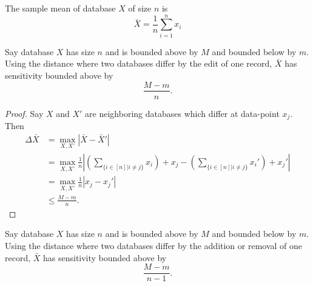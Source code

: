 \documentclass[11pt, oneside]{article}    %
\begin{document}
    \begin{definition}
        The sample mean of database $X$ of size $n$ is
        $$\bar{X} = \frac{1}{n} \sum_{i=1}^n x_i $$
    \end{definition}

    \begin{theorem}
        Say database $X$ has size $n$ and is bounded above by $M$ and bounded below by $m$. Using the distance where two databases differ by the edit of one record, $\bar{X}$ has sensitivity bounded above by
        $$ \frac{M-m}{n}.$$
    \end{theorem}

    \begin{proof}
        Say $X$ and $X'$ are neighboring databases which differ at data-point $x_j$. Then
        \begin{align*}
            \Delta{\bar{X}} &= \max_{X,X'} \left\vert \bar{X} - \bar{X}' \right\vert \\
            &=  \max_{X,X'} \frac{1}{n} \left\vert \left(\sum_{\{ i \in [n] \vert i \ne j\}} x_i\right) + x_j - \left(\sum_{\{ i \in [n] \vert i \ne j\}} x_i'\right) + x_j'  \right\vert \\
            &= \max_{X,X'} \frac{1}{n} \left\vert x_j - x_j' \right\vert \\
            &\le \frac{M-m}{n}.
        \end{align*}
    \end{proof}

    \begin{theorem}
        Say database $X$ has size $n$ and is bounded above by $M$ and bounded below by $m$.
        Using the distance where two databases differ by the addition or removal of one record, $\bar{X}$ has sensitivity bounded above by
        $$ \frac{M-m}{n - 1}.$$
    \end{theorem}
\end{document}
